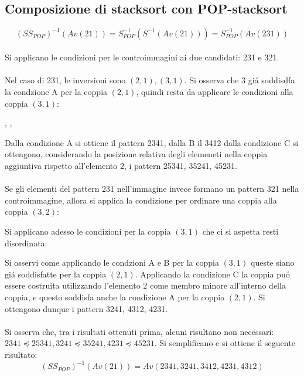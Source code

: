 \subsection*{Composizione di {stacksort} con {POP-stacksort}}
$$(S{S_{POP}})^{-1}(Av(21)) = S_{POP}^{-1}(S^{-1}(Av(21))) = S_{POP}^{-1}(Av(231))$$
\\Si applicano le condizioni per le controimmagini ai due candidati: 231 e 321.\\\\
Nel caso di 231, le inversioni sono $(2,1),(3,1)$. Si osserva che 3 gi\'a soddisdfa la condzione A per la coppia $(2,1)$, quindi resta da applicare le condizioni alla coppia $(3,1)$:
\begin{center}
,
,
\end{center}
Dalla condizione A si ottiene il pattern 2341, dalla B il 3412 dalla condizione C si ottengono, considerando la posizione relativa degli elemeneti nella coppia aggiuntiva rispetto all'elemento 2, i pattern 25341, 35241, 45231.\\\\
Se gli elementi del pattern 231 nell'immagine invece formano un pattern 321 nella controimmagine, allora si applica la condizione per ordinare una coppia alla coppia $(3,2)$:
\begin{center}
\end{center}
Si applicano adesso le condizioni per la coppia $(3,1)$ che ci si aspetta resti disordinata:
\begin{center}
\end{center}
Si osservi come applicando le condzioni A e B per la coppia $(3,1)$ queste siano gi\'a soddisfatte per la coppia $(2,1)$. Applicando la condizione C la coppia pu\'o essere costruita utilizzando l'elemento 2 come membro minore all'interno della coppia, e questo soddisfa anche la condizione A per la coppia $(2,1)$. Si ottengono dunque i pattern 3241, 4312, 4231.\\\\
Si osserva che, tra i risultati ottenuti prima, alcuni risultano non necessari: $2341\preceq25341, 3241\preceq35241, 4231\preceq45231$. Si semplificano e si ottiene il seguente risultato:
$$(S{S_{POP}})^{-1}(Av(21)) = Av(2341, 3241, 3412, 4231, 4312)$$
